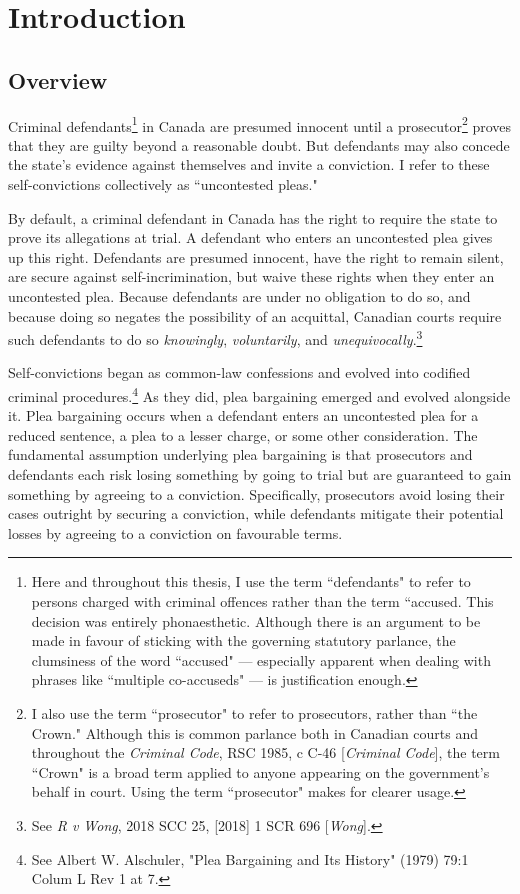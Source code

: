 \chapter{Introduction}

\section{Overview}

Criminal defendants\footnote{Here and throughout this thesis, I use the term ``defendants" to refer to persons charged with criminal offences rather than the term ``accused. This decision was entirely phonaesthetic. Although there is an argument to be made in favour of sticking with the governing statutory parlance, the clumsiness of the word ``accused" — especially apparent when dealing with phrases like ``multiple co-accuseds" — is justification enough.} in Canada are presumed innocent until a prosecutor\footnote{I also use the term ``prosecutor" to refer to prosecutors, rather than ``the Crown." Although this is common parlance both in Canadian courts and throughout the \textit{Criminal Code}, RSC 1985, c C-46 [\textit{Criminal Code}], the term ``Crown" is a broad term applied to anyone appearing on the government's behalf in court. Using the term ``prosecutor" makes for clearer usage.} proves that they are guilty beyond a reasonable doubt. But defendants may also concede the state's evidence against themselves and invite a conviction. I refer to these self-convictions collectively as ``uncontested pleas."

By default, a criminal defendant in Canada has the right to require the state to prove its allegations at trial. A defendant who enters an uncontested plea gives up this right. Defendants are presumed innocent, have the right to remain silent, are secure against self-incrimination, but waive these rights when they enter an uncontested plea. Because defendants are under no obligation to do so, and because doing so negates the possibility of an acquittal, Canadian courts require such defendants to do so \textit{knowingly}, \textit{voluntarily}, and \textit{unequivocally}.\footnote{See \textit{R v Wong}, 2018 SCC 25, [2018] 1 SCR 696 [\textit{Wong}].}

Self-convictions began as common-law confessions and evolved into codified criminal procedures.\footnote{See Albert W. Alschuler, "Plea Bargaining and Its History" (1979) 79:1 Colum L Rev 1 at 7.} As they did, plea bargaining emerged and evolved alongside it. Plea bargaining occurs when a defendant enters an uncontested plea for a reduced sentence, a plea to a lesser charge, or some other consideration. The fundamental assumption underlying plea bargaining is that prosecutors and defendants each risk losing something by going to trial but are guaranteed to gain something by agreeing to a conviction. Specifically, prosecutors avoid losing their cases outright by securing a conviction, while defendants mitigate their potential losses by agreeing to a conviction on favourable terms.

